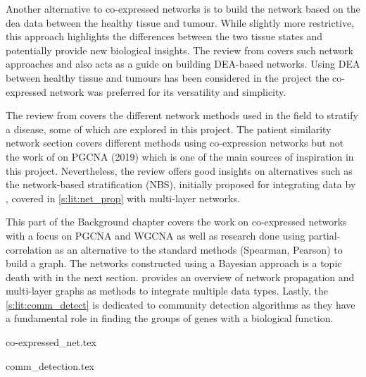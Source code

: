 Another alternative to co-expressed networks is to build the network based on the \acrfull{dea} data between the healthy tissue and tumour. While slightly more restrictive, this approach highlights the differences between the two tissue states and potentially provide new biological insights. The review from \citet{Van_Dam2018-id} covers such network approaches and also acts as a guide on building DEA-based networks. Using DEA between healthy tissue and tumours has been considered in the project the co-expressed network was preferred for its versatility and simplicity.

The review from \citet{Petti2023-qo} covers the different network methods used in the field to stratify a disease, some of which are explored in this project. The patient similarity network section covers different methods using co-expression networks but not the work of \citet{Care2019-ij} on PGCNA (2019) which is one of the main sources of inspiration in this project. Nevertheless, the review offers good insights on alternatives such as the network-based stratification (NBS), initially proposed for integrating data by \citet{Hofree2013-ld}, covered in \cref{s:lit:net_prop} with multi-layer networks.

This part of the Background chapter covers the work on co-expressed networks with a focus on PGCNA and WGCNA as well as research done using partial-correlation as an alternative to the standard methods (Spearman, Pearson) to build a graph. The networks constructed using a Bayesian approach is a topic death with in the next section.  provides an overview of network propagation and multi-layer graphs as methods to integrate multiple data types. Lastly, the \cref{s:lit:comm_detect} is dedicated to community detection algorithms as they have a fundamental role in finding the groups of genes with a biological function.

{co-expressed_net.tex}

{comm_detection.tex}






